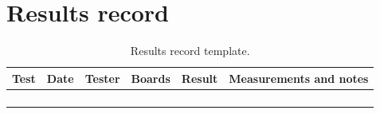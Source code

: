 \documentclass[11pt]{article}
\begin{document}
\section{Results record}

\begin{table}[H]
  \centering
  \footnotesize
  \setlength{\tabcolsep}{3pt}
  \begin{tabularx}{\textwidth}{@{}p{}p{}p{}p{}p{}X@{}}
    \toprule
    \textbf{Test} & \textbf{Date} & \textbf{Tester} & \textbf{Boards} & \textbf{Result} & \textbf{Measurements and notes} \\
    \midrule
    \rule{0pt}{2.2em} & & & & & \\
    \rule{0pt}{2.2em} & & & & & \\
    \rule{0pt}{2.2em} & & & & & \\
    \rule{0pt}{2.2em} & & & & & \\
    \bottomrule
  \end{tabularx}
  \caption{Results record template.}
  \label{tab:log}
\end{table}
\end{document}
